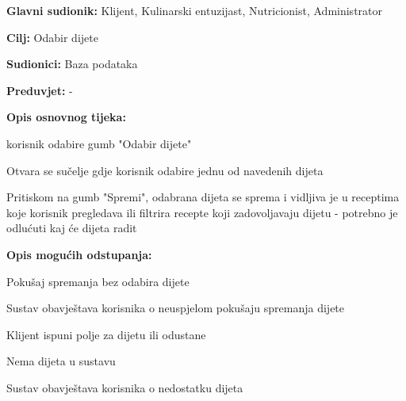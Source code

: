 					\noindent {}
					\begin{packed_item}
	
						\item \textbf{Glavni sudionik: }Klijent, Kulinarski entuzijast, Nutricionist, Administrator 
						\item  \textbf{Cilj:} Odabir dijete
						\item  \textbf{Sudionici:} Baza podataka
						\item  \textbf{Preduvjet:} -
						\item  \textbf{Opis osnovnog tijeka:} 
						
						\item[] \begin{packed_enum}
	
							\item korisnik odabire gumb "Odabir dijete"
							\item Otvara se sučelje gdje korisnik odabire jednu od navedenih dijeta
							\item Pritiskom na gumb "Spremi", odabrana dijeta se sprema i vidljiva je u receptima koje korisnik pregledava ili filtrira recepte koji zadovoljavaju dijetu - potrebno je odlućuti kaj će dijeta radit
						\end{packed_enum}
						
						\item  \textbf{Opis mogućih odstupanja:}
						
						\item[] \begin{packed_item}
	
							\item[2.a] Pokušaj spremanja bez odabira dijete
							\item[] \begin{packed_enum}
								
								\item Sustav obavještava korisnika o neuspjelom pokušaju spremanja dijete
								\item Klijent ispuni polje za dijetu ili odustane
								
							\end{packed_enum}							
							\item[2.b] Nema dijeta u sustavu
							\item[] \begin{packed_enum}
								
								\item Sustav obavještava korisnika o nedostatku dijeta
								
							\end{packed_enum}

						\end{packed_item}
					\end{packed_item}





